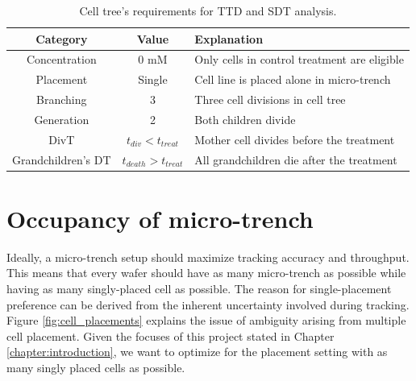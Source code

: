\documentclass[pdftex,12pt,a4paper]{report}
\begin{document}
\begin{table}[H]
\centering
\begin{tabular}{ c | c | l }
\hline
Category & Value & Explanation \\
\hline\hline
Concentration & 0 mM & Only cells in control treatment are eligible\\
Placement & Single & Cell line is placed alone in micro-trench \\
Branching & 3 & Three cell divisions in cell tree \\
Generation & 2 & Both children divide \\
DivT & $t_{div} < t_{treat}$ & Mother cell divides before the treatment\\
Grandchildren's DT & $t_{death} > t_{treat}$  & All grandchildren die after the treatment
\end{tabular}
\caption[Cell tree's requirements for TTD and SDT analysis]{Cell tree's requirements for TTD and SDT analysis.}
\label{table:cell_reqs_ccd}
\end{table}

\section{Occupancy of micro-trench}
\label{section:occupancy_of_microtrench}

Ideally, a micro-trench setup should maximize tracking accuracy and throughput. This means that every wafer should have as many micro-trench as possible while having as many singly-placed cell as possible. The reason for single-placement preference can be derived from the inherent uncertainty involved during tracking. Figure \ref{fig:cell_placements} explains the issue of ambiguity arising from multiple cell placement. Given the focuses of this project stated in Chapter \ref{chapter:introduction}, we want to optimize for the placement setting with as many singly placed cells as possible.
\end{document}
